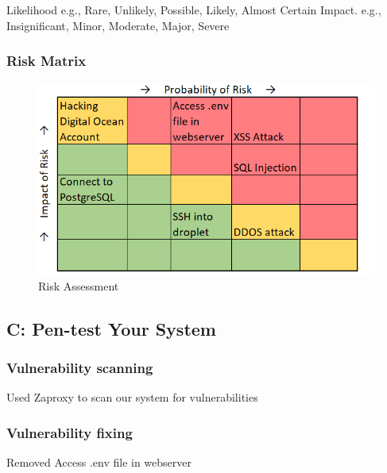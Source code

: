 Likelihood e.g., Rare, Unlikely, Possible, Likely, Almost Certain
Impact. e.g., Insignificant, Minor, Moderate, Major, Severe

\subsubsection*{Risk Matrix}

\begin{figure}[h!]
\begin{center}
    \includegraphics[scale=0.9]{figures/risk assessment.png}
    \caption{Risk Assessment}
  \label{riskmatrix}
\end{center}
\end{figure}

\subsection*{C: Pen-test Your System}
\subsubsection*{Vulnerability scanning}
Used Zaproxy to scan our system for vulnerabilities

\subsubsection*{Vulnerability fixing}
Removed Access .env file in webserver
\fi